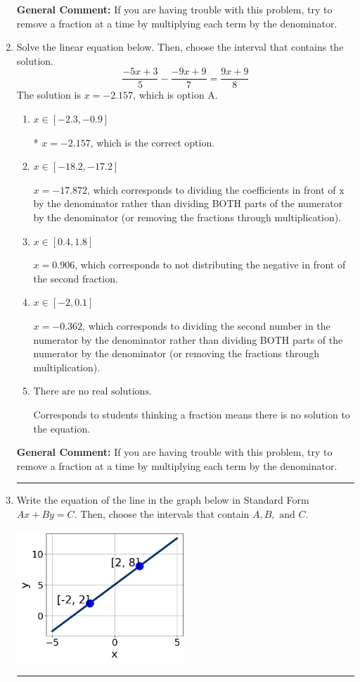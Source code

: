 \documentclass{extbook}[14pt]
\newcommand{\litem}[1]{\item #1

\rule{\textwidth}{0.4pt}}
\begin{document}
\begin{enumerate}
{\textbf{General Comment:} If you are having trouble with this problem, try to remove a fraction at a time by multiplying each term by the denominator.
}
\litem{
Solve the linear equation below. Then, choose the interval that contains the solution.
\[ \frac{-5x + 3}{5} - \frac{-9x + 9}{7} = \frac{9x + 9}{8} \]The solution is \( x = -2.157 \), which is option A.\begin{enumerate}[label=\Alph*.]
\item \( x \in [-2.3, -0.9] \)

* $x = -2.157$, which is the correct option.
\item \( x \in [-18.2, -17.2] \)

 $x = -17.872$, which corresponds to dividing the coefficients in front of x by the denominator rather than dividing BOTH parts of the numerator by the denominator (or removing the fractions through multiplication).
\item \( x \in [0.4, 1.8] \)

 $x = 0.906$, which corresponds to not distributing the negative in front of the second fraction.
\item \( x \in [-2, 0.1] \)

 $x = -0.362$, which corresponds to dividing the second number in the numerator by the denominator rather than dividing BOTH parts of the numerator by the denominator (or removing the fractions through multiplication).
\item \( \text{There are no real solutions.} \)

Corresponds to students thinking a fraction means there is no solution to the equation.
\end{enumerate}

\textbf{General Comment:} If you are having trouble with this problem, try to remove a fraction at a time by multiplying each term by the denominator.
}
\litem{
Write the equation of the line in the graph below in Standard Form $Ax+By=C$. Then, choose the intervals that contain $A, B, \text{ and } C$.

\begin{center}
    \includegraphics[width=0.5\textwidth]{../Figures/linearGraphToStandardCopyC.png}
\end{center}


}
\end{enumerate}
\end{document}

